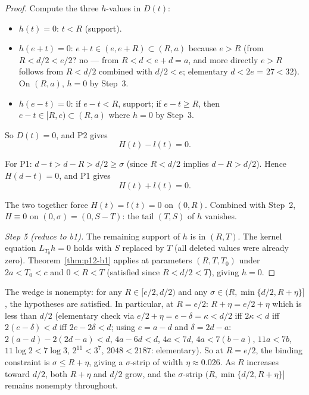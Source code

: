\begin{proof}
Compute the three $h$-values in $D(t)$:
\begin{itemize}
\item $h(t) = 0$: $t < R$ (support).
\item $h(e + t) = 0$: $e + t \in (e, e + R) \subset (R, a)$ because
  $e > R$ (from $R < d/2 < e/2$? no --- from $R < d < e + d = a$, and
  more directly $e > R$ follows from $R < d/2$ combined with
  $d/2 < e$; elementary $d < 2e$ = $27 < 32$).
  On $(R, a)$, $h = 0$ by Step~3.
\item $h(e - t) = 0$: if $e - t < R$, support; if $e - t \ge R$, then
  $e - t \in [R, e) \subset (R, a)$ where $h = 0$ by Step~3.
\end{itemize}
So $D(t) = 0$, and P2 gives
\[
H(t) - l(t) = 0.
\]

For P1: $d - t > d - R > d/2 \ge \sigma$ (since $R < d/2$ implies
$d - R > d/2$).  Hence $H(d - t) = 0$, and P1 gives
\[
H(t) + l(t) = 0.
\]

The two together force $H(t) = l(t) = 0$ on $(0, R)$.
Combined with Step~2, $H \equiv 0$ on $(0, \sigma) = (0, S - T)$:
the tail $(T, S)$ of $h$ vanishes.

\smallskip
\noindent\emph{Step 5 (reduce to b1).}
The remaining support of $h$ is in $(R, T)$.  The kernel equation
$L_{T_0} h = 0$ holds with $S$ replaced by $T$ (all deleted values
were already zero).  Theorem~\ref{thm:p12-b1} applies at
parameters $(R, T, T_0)$ under $2a < T_0 < c$ and $0 < R < T$
(satisfied since $R < d/2 < T$), giving $h = 0$.
\end{proof}

\begin{remark}
\label{rem:p12-b2d-wedge-nonempty}
The wedge is nonempty: for any $R \in [e/2, d/2)$ and any
$\sigma \in (R, \min\{d/2, R + \eta\}]$, the hypotheses are
satisfied.  In particular, at $R = e/2$: $R + \eta = e/2 + \eta$
which is less than $d/2$ (elementary check via
$e/2 + \eta = e - \delta = \kappa < d/2$ iff $2\kappa < d$
iff $2(e - \delta) < d$ iff $2e - 2\delta < d$; using
$e = a - d$ and $\delta = 2d - a$: $2(a - d) - 2(2d - a) < d$,
$4a - 6d < d$, $4a < 7d$, $4a < 7(b - a)$, $11a < 7b$,
$11 \log 2 < 7 \log 3$, $2^{11} < 3^{7}$, $2048 < 2187$: elementary).
So at $R = e/2$, the binding constraint is $\sigma \le R + \eta$,
giving a $\sigma$-strip of width $\eta \approx 0.026$.  As $R$
increases toward $d/2$, both $R + \eta$ and $d/2$ grow, and the
$\sigma$-strip $(R, \min\{d/2, R + \eta\}]$ remains nonempty
throughout.
\end{remark}

